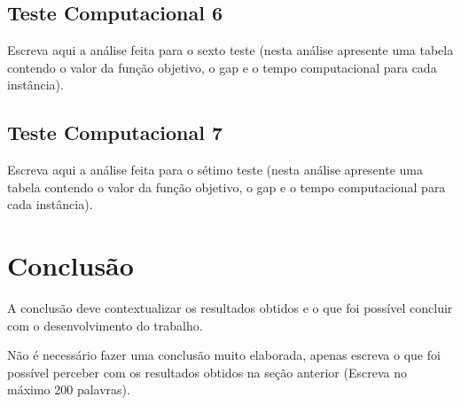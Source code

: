 \documentclass{article}
\begin{document}
\subsection{Teste Computacional 6}

Escreva aqui a análise feita para o sexto teste (nesta análise apresente uma tabela contendo o valor da função objetivo, o gap e o tempo computacional para cada instância).

\subsection{Teste Computacional 7}

Escreva aqui a análise feita para o sétimo teste (nesta análise apresente uma tabela contendo o valor da função objetivo, o gap e o tempo computacional para cada instância).

\section{Conclusão}
\label{sec:conclusao}

A conclusão deve contextualizar os resultados obtidos e o que foi possível concluir com o desenvolvimento do trabalho. 

Não é necessário fazer uma conclusão muito elaborada, apenas escreva o que foi possível perceber com os resultados obtidos na seção anterior (Escreva no máximo 200 palavras).

% 
% 
\end{document}
